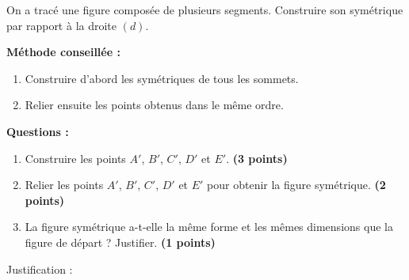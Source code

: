 \documentclass[11pt,a4paper]{article}
\newcommand{\points}[1]{\hfill \textbf{(#1 points)}}
\begin{document}
On a tracé une figure composée de plusieurs segments.  
Construire son symétrique par rapport à la droite $(d)$.

\medskip

\textbf{Méthode conseillée :}
\begin{enumerate}[label=\textbullet]
    \item Construire d'abord les symétriques de tous les sommets.
    \item Relier ensuite les points obtenus dans le même ordre.
\end{enumerate}

\begin{center}
\end{center}

\textbf{Questions :}

\begin{enumerate}[label=\arabic*)]
    \item Construire les points $A'$, $B'$, $C'$, $D'$ et $E'$. \points{3}
    \item Relier les points $A'$, $B'$, $C'$, $D'$ et $E'$ pour obtenir la figure symétrique. \points{2}
    \item La figure symétrique a-t-elle la même forme et les mêmes dimensions que la figure de départ ? Justifier. \points{1}
\end{enumerate}

\vspace{0.8cm}

Justification :

\dotfill

\dotfill

\dotfill

\end{document}

